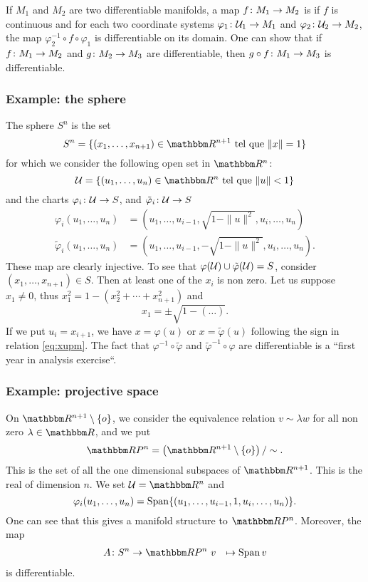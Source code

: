 If $M_1$ and $M_2$ are two differentiable manifolds, a map $f\colon M_1\to M_2$ is  if $f$ is continuous and for each two coordinate systems $\varphi_1\colon \mathcal{U}_1\to M_1$ and $\varphi_2\colon \mathcal{U}_2\to M_2$, the map $\varphi_2^{-1}\circ f\circ\varphi_1$ is differentiable on its domain. One can show that if $f\colon M_1\to M_2$ and $g\colon M_2\to M_3$ are differentiable, then $g\circ f\colon M_1\to M_3$ is differentiable.

\subsubsection{Example: the sphere}

The sphere $S^n$ is the set
\[
  S^n=\{  (x_1,\ldots, x_{n+1})\in\eR^{n+1}\tq \|x\|=1  \}
\]
for which we consider the following open set in $\eR^n$:
\[
   \mU=\{  (u_1,\ldots,u_n)\in\eR^n\tq\|u\|<1  \}
\]
and the charts $\varphi_i\colon \mathcal{U}\to S$, and $\tilde{\varphi}_i\colon \mathcal{U}\to S$
\begin{subequations}
\begin{align}
   \varphi_i(u_1,\ldots,u_n)&=(u_1,\ldots,u_{i-1}, \sqrt{  1-\|u\|^2  },u_i,\ldots,u_n )\\
   \tilde{\varphi}_i(u_1,\ldots,u_n)&=(u_1,\ldots,u_{i-1}, -\sqrt{  1-\|u\|^2  },u_i,\ldots,u_n ).
\end{align}
\end{subequations}
These map are clearly injective. To see that $\varphi(\mathcal{U})\cup\tilde{\varphi}(\mathcal{U})=S$, consider $(x_1,\ldots,x_{n+1})\in S$. Then at least one of the $x_i$ is non zero. Let us suppose $x_1\neq 0$, thus $x_1^2=1-(x_2^2+\cdots+x_{n+1}^2)$ and
\begin{equation}\label{eq:xupm}
   x_1=\pm\sqrt{1-(\ldots)}.
\end{equation}
If we put $u_i=x_{i+1}$, we have $x=\varphi(u)$ or $x=\tilde{\varphi}(u)$ following the sign in relation \eqref{eq:xupm}. The fact that $\varphi^{-1}\circ\tilde{\varphi}$ and $\tilde{\varphi}^{-1}\circ\varphi$ are differentiable is a ``first year in analysis exercise``.

\subsubsection{Example: projective space}

On $\eR^{n+1}\setminus\{o\}$, we consider the equivalence relation $v\sim\lambda w$ for all non zero $\lambda\in\eR$, and we put
\[
  \eR P^n=\left(\eR^{n+1}\setminus\{o\}\right)/\sim.
\]
This is the set of all the one dimensional subspaces of $\eR^{n+1}$. This is the real  of dimension $n$. We set $\mU=\eR^n$ and
\[
  \varphi_i(u_1,\ldots,u_n)=\operatorname{Span}\{ (u_1,\ldots,u_{i-1},1,u_i,\ldots,u_n) \}.
\]
One can see that this gives a manifold structure to $\eR P^n$. Moreover, the map
		\begin{equation}
		\begin{aligned}
			A \colon S^n &\to \eR P^n\
			v&\mapsto \Span v
		\end{aligned}
	\end{equation}	
is differentiable.

